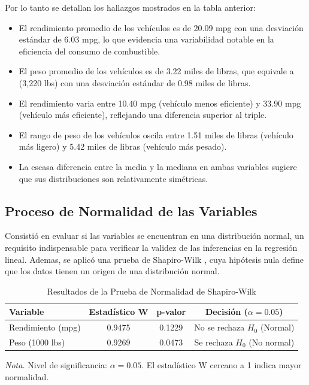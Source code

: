 \documentclass[12pt, letterpaper]{article}
\begin{document}
    Por lo tanto se detallan los hallazgos mostrados en la tabla anterior:

    \begin{itemize}
        \item El rendimiento promedio de los vehículos es de 20.09 mpg con una
            desviación estándar de 6.03 mpg, lo que evidencia una variabilidad notable 
            en la eficiencia del consumo de combustible.
        \item El peso promedio de los vehículos es de 3.22 miles de libras, que equivale a (3,220 lbs)
            con una desviación estándar de 0.98 miles de libras.
        \item El rendimiento varia entre 10.40 mpg (vehículo menos eficiente)
 y 33.90 mpg (vehículo más eficiente), reflejando  una diferencia
            superior al triple.
        \item El rango de peso de los vehículos oscila  entre  1.51 miles de libras (vehículo más ligero)
            y 5.42 miles de libras (vehículo más pesado).
        \item La escasa diferencia entre la media y la mediana en ambas variables sugiere que sus distribuciones son relativamente simétricas. 
    \end{itemize}

    \subsection{Proceso de Normalidad de las Variables}

    Consistió en evaluar si las variables se encuentran en una distribución normal, un requisito indispensable para verificar la validez de las inferencias en la regresión lineal. Ademas, se aplicó una prueba de Shapiro-Wilk \textcite{shapiro1965}, cuya hipótesis nula define que los datos tienen un origen de una distribución normal.

    \begin{table}[H]
        \centering
        \caption{Resultados de la Prueba de Normalidad de Shapiro-Wilk}
        \begin{tabular}{@{}lccc@{}}
            \toprule 
            \textbf{Variable}     & \textbf{Estadístico W} & \textbf{p-valor} & \textbf{Decisión ($\alpha = 0.05$)} \\
            \midrule 
            Rendimiento (mpg)     & 0.9475                 & 0.1229           & No se rechaza $H_0$ (Normal)       \\
            Peso (1000 lbs)       & 0.9269                 & 0.0473           & Se rechaza $H_0$ (No normal)       \\
            \bottomrule
        \end{tabular}
        \label{tab:normalidad}
        
        \vspace{0.2cm}
        \textit{Nota.} Nivel de significancia: $\alpha = 0.05$. El estadístico W cercano a 1 indica mayor normalidad.
    \end{table}
\end{document}
